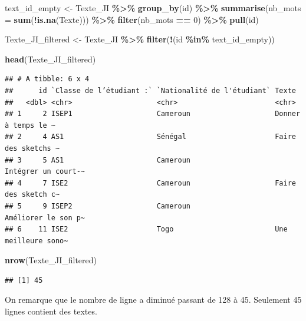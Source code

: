 \documentclass[
]{article}
\newenvironment{Shaded}{\begin{snugshade}}{\end{snugshade}}
\newcommand{\AttributeTok}[1]{\textcolor[rgb]{0.13,0.29,0.53}{#1}}
\newcommand{\DecValTok}[1]{\textcolor[rgb]{0.00,0.00,0.81}{#1}}
\newcommand{\FunctionTok}[1]{\textcolor[rgb]{0.13,0.29,0.53}{\textbf{#1}}}
\newcommand{\NormalTok}[1]{#1}
\newcommand{\OtherTok}[1]{\textcolor[rgb]{0.56,0.35,0.01}{#1}}
\newcommand{\SpecialCharTok}[1]{\textcolor[rgb]{0.81,0.36,0.00}{\textbf{#1}}}
\begin{document}
\begin{Shaded}
\begin{Highlighting}[]
\NormalTok{text\_id\_empty }\OtherTok{\textless{}{-}}\NormalTok{ Texte\_JI }\SpecialCharTok{\%\textgreater{}\%}
  \FunctionTok{group\_by}\NormalTok{(id) }\SpecialCharTok{\%\textgreater{}\%}
  \FunctionTok{summarise}\NormalTok{(}\AttributeTok{nb\_mots =} \FunctionTok{sum}\NormalTok{(}\SpecialCharTok{!}\FunctionTok{is.na}\NormalTok{(Texte))) }\SpecialCharTok{\%\textgreater{}\%}
  \FunctionTok{filter}\NormalTok{(nb\_mots }\SpecialCharTok{==} \DecValTok{0}\NormalTok{) }\SpecialCharTok{\%\textgreater{}\%}
  \FunctionTok{pull}\NormalTok{(id)}

\NormalTok{Texte\_JI\_filtered }\OtherTok{\textless{}{-}}\NormalTok{ Texte\_JI }\SpecialCharTok{\%\textgreater{}\%} 
  \FunctionTok{filter}\NormalTok{(}\SpecialCharTok{!}\NormalTok{(id }\SpecialCharTok{\%in\%}\NormalTok{ text\_id\_empty))}

\FunctionTok{head}\NormalTok{(Texte\_JI\_filtered)}
\end{Highlighting}
\end{Shaded}

\begin{verbatim}
## # A tibble: 6 x 4
##      id `Classe de l’étudiant :` `Nationalité de l'étudiant` Texte              
##   <dbl> <chr>                    <chr>                       <chr>              
## 1     2 ISEP1                    Cameroun                    Donner à temps le ~
## 2     4 AS1                      Sénégal                     Faire des sketchs ~
## 3     5 AS1                      Cameroun                    Intégrer un court-~
## 4     7 ISE2                     Cameroun                    Faire des sketch c~
## 5     9 ISEP2                    Cameroun                    Améliorer le son p~
## 6    11 ISE2                     Togo                        Une meilleure sono~
\end{verbatim}

\begin{Shaded}
\begin{Highlighting}[]
\FunctionTok{nrow}\NormalTok{(Texte\_JI\_filtered)}
\end{Highlighting}
\end{Shaded}

\begin{verbatim}
## [1] 45
\end{verbatim}

On remarque que le nombre de ligne a diminué passant de 128 à 45.
Seulement 45 lignes contient des textes.
\end{document}
